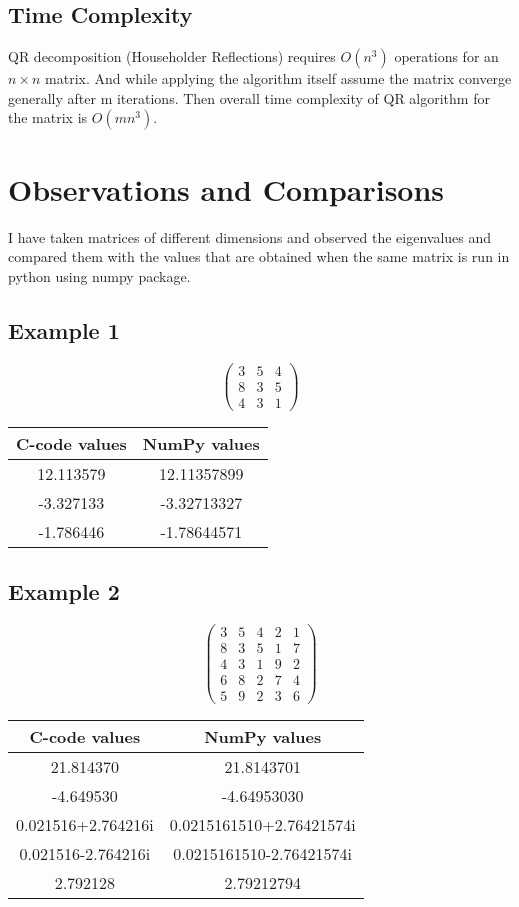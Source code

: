 \documentclass[a4paper, 14pt]{article}
\begin{document}
\subsection*{Time Complexity}
QR decomposition (Householder Reflections) requires $O(n^3)$ operations for an $n \times n $ matrix. And while applying the algorithm itself assume the matrix converge generally after m iterations. Then overall time complexity of QR algorithm for the matrix is $O(mn^3)$. 
\pagebreak
\section*{Observations and Comparisons}
I have taken matrices of different dimensions and observed the eigenvalues and compared them with the values that are obtained when the same matrix is run in python using numpy package.
\subsection*{Example 1}
\[
\begin{pmatrix}
3 & 5 & 4 \\
8 & 3 & 5 \\
4 & 3 & 1
\end{pmatrix}
\]
\par
\vspace{1em}
\begin{tabular}{|c|c|}
\hline
\textbf{C-code values} & \textbf{NumPy values} \\ \hline
12.113579             & 12.11357899           \\ 
-3.327133             & -3.32713327           \\ 
-1.786446             & -1.78644571           \\ \hline
\end{tabular}

\subsection*{Example 2}
\[
\begin{pmatrix}
3 & 5 & 4 & 2 & 1 \\
8 & 3 & 5 & 1 & 7 \\
4 & 3 & 1 & 9 & 2 \\
6 & 8 & 2 & 7 & 4 \\
5 & 9 & 2 & 3 & 6
\end{pmatrix}
\]
\par
\vspace{1em}
\begin{tabular}{|c|c|}
\hline
\textbf{C-code values}       & \textbf{NumPy values}          \\ \hline
21.814370                   & 21.8143701                     \\ 
-4.649530                   & -4.64953030                    \\ 
0.021516+2.764216i          & 0.0215161510+2.76421574i       \\ 
0.021516-2.764216i          & 0.0215161510-2.76421574i       \\ 
2.792128                    & 2.79212794                     \\ \hline
\end{tabular}
\end{document}
